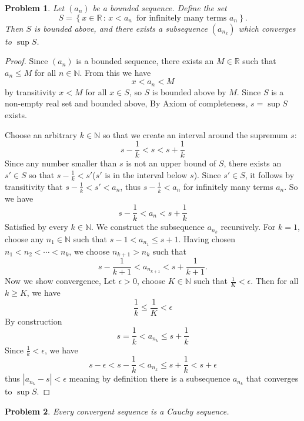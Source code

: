 \documentclass[12pt]{article}
\newtheorem{problem}{Problem}
\newcommand{\NN}{\ensuremath{\mathbb N}}
\newcommand{\RR}{\ensuremath{\mathbb R}}
\newcommand{\eps}{\ensuremath{\epsilon}}
\begin{document}
\begin{problem} %
Let $(a_n)$ be a bounded sequence.  Define the set
	$$S = \left\{x\in\RR\,:\, x < a_n \,\text{ for infinitely many terms } a_n\right\}.$$
Then $S$ is bounded above, and there exists a subsequence $(a_{n_k})$ which converges to $\sup S$.
\end{problem}
\begin{proof}
Since $(a_n)$ is a bounded sequence, there exists an $M \in \RR$ such that $a_n \leq M$ for all $n \in \NN$. From this we have
$$x < a_n < M$$
by transitivity $x < M$ for all $x \in S$, so $S$ is bounded above by $M$. Since $S$ is a non-empty real set and bounded above, By Axiom of completeness, $s = \sup S$ exists.

Choose an arbitrary $k \in \NN$ so that we create an interval around the supremum $s$: $$s-\frac{1}{k} < s < s+\frac{1}{k}$$ Since any number smaller than $s$ is not an upper bound of $S$, there exists an $s' \in S$ so that $s-\frac{1}{k} < s'$($s'$ is in the interval below $s$). Since $s' \in S$, it follows by transitivity that $s-\frac{1}{k} < s' < a_n$, thus $s-\frac{1}{k} < a_n$ for infinitely many terms $a_n$. So we have $$s-\frac{1}{k} < a_n < s + \frac{1}{k}$$ Satisfied by every $k \in \NN$. We construct the subsequence $a_{n_k}$ recursively.
For $k = 1$, choose any $n_1 \in \NN$ such that $s - 1 < a_{n_1} \leq s + 1$. Having chosen 
$n_1 < n_2 < \cdots < n_k$, we choose $n_{k+1} > n_k$ such that 
$$s - \frac{1}{k+1} < a_{n_{k+1}} < s + \frac{1}{k+1}.$$ Now we show convergence, Let $\eps > 0$, choose $K \in \NN$ such that $\frac{1}{K} < \eps$. Then for all $k \geq K$, we have
$$\frac{1}{k} \leq \frac{1}{K} < \eps$$
By construction
$$s = \frac{1}{k} < a_{n_k} \leq s + \frac{1}{k}$$
Since $\frac{1}{k} < \eps$, we have
$$ s- \eps < s - \frac{1}{k} < a_{n_k} \leq s + \frac{1}{k} < s + \eps$$
thus $|a_{n_k} - s| < \eps$ meaning by definition there is a subsequence $a_{n_k}$ that converges to $\sup S$.
\end{proof}


\begin{problem} %
Every convergent sequence is a Cauchy sequence.
\end{problem}

\end{document}

